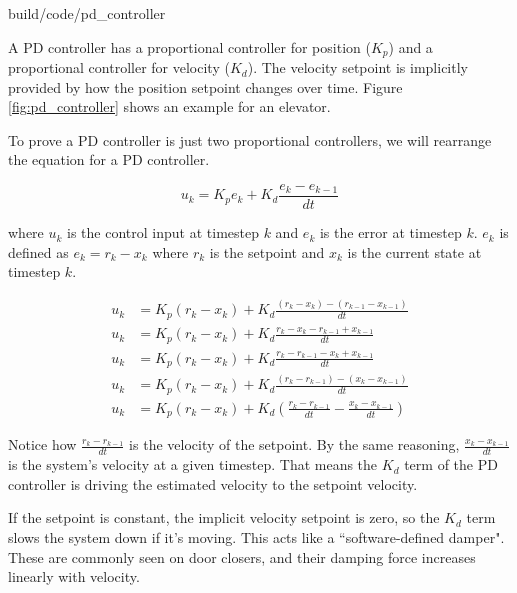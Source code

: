 \begin{svg}{build/code/pd_controller}
  \caption{PD controller on an elevator}
  \label{fig:pd_controller}
\end{svg}

A PD controller has a proportional controller for position ($K_p$) and a
proportional controller for velocity ($K_d$). The velocity \gls{setpoint} is
implicitly provided by how the position \gls{setpoint} changes over time. Figure
\ref{fig:pd_controller} shows an example for an elevator.

To prove a PD controller is just two proportional controllers, we will rearrange
the equation for a PD controller.

\begin{equation*}
  u_k = K_p e_k + K_d \frac{e_k - e_{k-1}}{dt}
\end{equation*}

where $u_k$ is the \gls{control input} at timestep $k$ and $e_k$ is the
\gls{error} at timestep $k$. $e_k$ is defined as $e_k = r_k - x_k$ where $r_k$
is the \gls{setpoint} and $x_k$ is the current \gls{state} at timestep $k$.

\begin{align*}
  u_k &= K_p (r_k - x_k) + K_d \frac{(r_k - x_k) - (r_{k-1} - x_{k-1})}{dt} \\
  u_k &= K_p (r_k - x_k) + K_d \frac{r_k - x_k - r_{k-1} + x_{k-1}}{dt} \\
  u_k &= K_p (r_k - x_k) + K_d \frac{r_k - r_{k-1} - x_k + x_{k-1}}{dt} \\
  u_k &= K_p (r_k - x_k) + K_d \frac{(r_k - r_{k-1}) - (x_k - x_{k-1})}{dt} \\
  u_k &= K_p (r_k - x_k) + K_d \left(\frac{r_k - r_{k-1}}{dt} -
    \frac{x_k - x_{k-1}}{dt}\right)
\end{align*}

Notice how $\frac{r_k - r_{k-1}}{dt}$ is the velocity of the \gls{setpoint}. By
the same reasoning, $\frac{x_k - x_{k-1}}{dt}$ is the \gls{system}'s velocity at
a given timestep. That means the $K_d$ term of the PD controller is driving the
estimated velocity to the \gls{setpoint} velocity.

If the \gls{setpoint} is constant, the implicit velocity \gls{setpoint} is zero,
so the $K_d$ term slows the \gls{system} down if it's moving. This acts like a
``software-defined damper". These are commonly seen on door closers, and their
damping force increases linearly with velocity.
